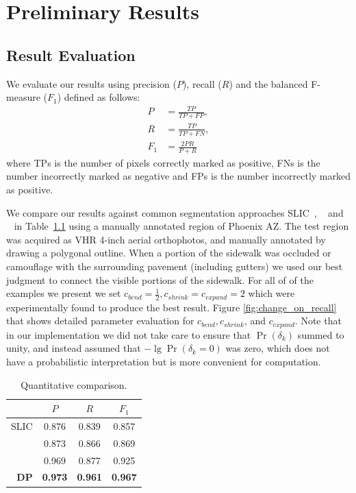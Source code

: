 \chapter{Preliminary Results}

\section{Result Evaluation}

We evaluate our results using precision ($P$), recall ($R$) and the balanced F-measure ($F_1$) defined as follows:
\begin{align}
     P &= \frac{\mathit{TP}}{\mathit{TP} + \mathit{FP}}, \\
     R &= \frac{\mathit{TP}}{\mathit{TP} + \mathit{FN}}, \\  
     F_1 &= \frac{2 P R}{P + R}
\end{align}
where 
\acp{TP} is the number of pixels correctly marked as positive, 
\acp{FN} is the number incorrectly marked as negative and 
\acp{FP} is the number incorrectly marked as positive. 

We compare our results against common segmentation approaches \ac{SLIC}~\cite{Achanta:149300},
\ActiveContours{}~\cite{ActiveContou09} and \GrabCut{}~\cite{Rother2004-ou} in
Table~\ref{tab:quantitative-against-common} using a manually annotated region of Phoenix AZ. The
test region was acquired as \ac{VHR} 4-inch aerial orthophotos, and manually annotated by drawing a
polygonal outline. When a portion of the sidewalk was occluded or camouflage with the surrounding
pavement (including gutters) we used our best judgment to connect the visible portions of the
sidewalk. For all of of the examples we present we set $c_\mathit{bend}=\frac{1}{2},
c_\mathit{shrink}=c_\mathit{expand}=2$ which were experimentally found to produce the best result. 
Figure \ref{fig:change_on_recall} that shows detailed parameter evaluation for
 $c_\mathit{bend},c_\mathit{shrink}$, and $c_\mathit{expand}$. 
Note that in our implementation we did not take care to ensure that $\Pr(\delta_k)$ summed to unity,
and instead assumed that $-\lg \Pr(\delta_k=0)$ was zero, which does not have a probabilistic
interpretation but is more convenient for computation.

\begin{table}[h!]
    \caption{Quantitative comparison. }
    \label{tab:quantitative-against-common}
    \centering
    \begin{tabular}{r ccc}
                            & $P$ & $R$& $F_1$ \\ 
                                 \hline 
                  \ac{SLIC} & 0.876 & 0.839 & 0.857 \\
          \ActiveContours{} & 0.873 & 0.866 & 0.869  \\
                 \GrabCut{} & 0.969 & 0.877 & 0.925  \\ 
                                 \hline
                \textbf{DP} & \textbf{0.973} & \textbf{0.961} & \textbf{0.967}   
    \end{tabular}
\end{table}

